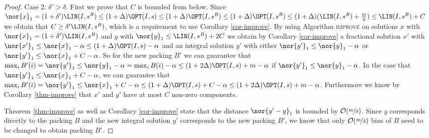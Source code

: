 \begin{proof}
	Case 2: $\delta' > \delta$.
    First we prove that $C$ is bounded from below. Since $\nor{x}_1 = (1+\delta') \LIN(I,s^R) \leq (1+ \Delta) \OPT(I,s)\leq (1+ \Delta) \OPT(I,s^R) \leq (1+ \Delta) \OPT(I,s^R) \leq (1+ \Delta) (\LIN(I,s^R) + \frac{m}{2}) \leq \LIN(I,s^R) +C$ we obtain that $C\geq \delta' \LIN(I,s^R)$, which is a requirement to use Corollary \ref{cor-improve}.
	By using Algorithm \textsc{improve} on solutions $x$ with $\nor{x}_1 = (1+\delta')\LIN(I,s^{R})$ and $y$ with $\nor{y}_1 \leq  \LIN(I,s^{R}) + 2C$ we obtain by Corollary \ref{cor-improve} a fractional solution $x'$ with
	$\nor{x'}_1 \leq \nor{x}_1 - \alpha \leq (1+\Delta)\OPT(I,s) - \alpha$ and an integral solution $y'$ with either $\nor{y'}_1 \leq \nor{y}_1 - \alpha$ or $\nor{y'}_1 \leq \nor{x}_1 + C - \alpha$.
	So for the new packing $B'$ we can guarantee that $\max_i B' (i) = \nor{y'}_1 \leq \nor{y}_1 - \alpha =  \max_i B (i) - \alpha	\leq (1+ 2\Delta) \OPT(I,s) +m - \alpha$ if $\nor{y'}_1 \leq \nor{y}_1 - \alpha$. In the case that $\nor{y'}_1 \leq \nor{x}_1 + C - \alpha$, we can guarantee that $\max_i B' (i) = \nor{y'}_1 \leq \nor{x}_1 + C - \alpha \leq (1+ \Delta) \OPT(I,s)+ C - \alpha \leq (1+ 2\Delta) \OPT(I,s) +m - \alpha$. Furthermore we know by Corollary \ref{thm-improve} that $x'$ and $y'$ have at most $C$ non-zero components.
    
Theorem \ref{thm-improve} as well as Corollary \ref{cor-improve} state that the distance $\nor{y'-y}_1$ is bounded by $\mathcal{O}(\nicefrac{m}{\delta})$. Since $y$ corresponds directly to the packing $B$ and the new integral solution $y'$ corresponds to the new packing $B'$, we know that only $\mathcal{O}(\nicefrac{m}{\delta})$ bins of $B$ need to be changed to obtain packing $B'$.
\end{proof}

